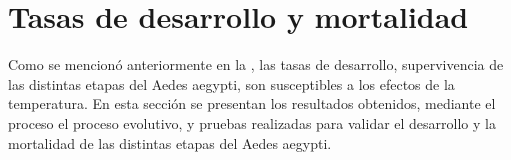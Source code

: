 \section{Tasas de desarrollo y mortalidad}
\label{sec:tasas-desarrollo-mortalidad}

Como se mencionó anteriormente en la , las tasas de desarrollo,
supervivencia de las distintas etapas del Aedes aegypti, son susceptibles a los efectos de la
temperatura. En esta sección se presentan los resultados obtenidos, mediante el proceso el proceso
evolutivo, y pruebas realizadas para validar el desarrollo y la mortalidad de las distintas etapas
del Aedes aegypti.







